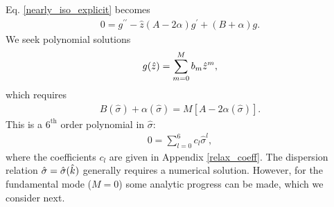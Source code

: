 Eq. \ref{nearly_iso_explicit} becomes 
\begin{align}
  0 = g^{\prime\prime} - \hat{z}\left(A - 2\alpha\right)g^\prime +
  \left(B + \alpha\right)g.
\end{align}
We seek polynomial solutions 
\begin{align}
  g(\hat{z}) = \sum_{m=0}^M b_m \hat{z}^m,
\end{align}
which requires
\begin{align}
  B(\hat{\sigma}) + \alpha(\hat{\sigma}) =
  M\left[A-2\alpha(\hat{\sigma})\right].\label{adia_disp0} 
\end{align}
This is a $6^\mathrm{th}$ order 
polynomial in $\hat{\sigma}$:  
\begin{align}
  0 = \sum_{l=0}^{6}c_l\hat{\sigma}^l,\label{relax_disp}
\end{align}
where the coefficients $c_l$ are given in Appendix \ref{relax_coeff}.
The dispersion relation $\hat{\sigma}=\hat{\sigma}(\hat{k})$ generally
requires a numerical solution. However, for the fundamental mode
($M=0$) some analytic progress can be made, which we consider next.  



